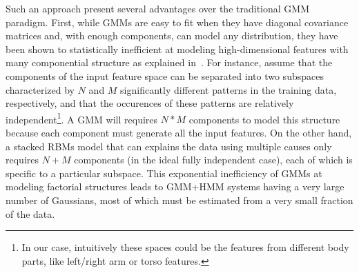 Such an approach present several advantages over the traditional GMM paradigm.
%
First, while  GMMs are easy to fit when they have diagonal covariance matrices and, with enough components,
can model any distribution, they have been shown to statistically inefficient at modeling high-dimensional features
with many componential structure as explained in~\cite{mohamed2012acoustic}.
%
For instance, assume that the components of the input feature space can be separated into two subspaces
characterized by  $N$  and $M$ significantly different  patterns in the training data, respectively, and that the occurences
of these patterns are relatively independent\footnote{In our case, intuitively these spaces could be the  features from different body parts,
like left/right arm or torso features.}.
%
A GMM will requires $N*M$ components to model this structure because each component must generate all the input features.
%
On the other hand, a stacked RBMs model that can explains the data using multiple causes only requires $N+M$ components
(in the ideal fully independent case), each of which is specific to a particular subspace.
%
This exponential inefficiency of GMMs at modeling factorial structures leads to GMM+HMM systems having
a very large number of Gaussians, most of which must be estimated from a very small fraction of the data.


